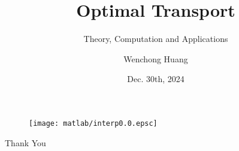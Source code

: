 \documentclass[10pt]{beamer}
\author{Wenchong Huang}
\title{Optimal Transport}
\subtitle{Theory, Computation and Applications}
\institute{
    School of Mathematical Sciences, \\
    Zhejiang University.
}
\date{Dec. 30th, 2024}
\begin{document}
\begin{frame}
    \titlepage
\end{frame}

\begin{frame}
    \begin{figure}
        \centering
        \texttt{[image: matlab/interp0.0.epsc]}
    \end{figure}
\end{frame}

% 

% 

% 

\begin{frame}
    \begin{center}
        {\Huge\calligra Thank You}
    \end{center}
\end{frame}
\end{document}
